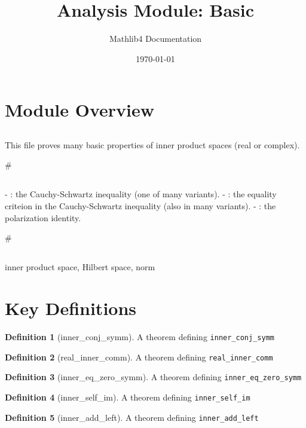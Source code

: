\documentclass{article}
\title{Analysis Module: Basic}
\author{Mathlib4 Documentation}
\date{\today}
\theoremstyle{definition}
\newtheorem{definition}{Definition}
\begin{document}
\maketitle

\section{Module Overview}
\subsection{\1}

This file proves many basic properties of inner product spaces (real or complex).

#\subsection{\1}

- \texttt{\1}: the Cauchy-Schwartz inequality (one of many variants).
- \texttt{\1}: the equality criteion in the Cauchy-Schwartz inequality (also in many
  variants).
- \texttt{\1}: the polarization identity.

#\subsection{\1}

inner product space, Hilbert space, norm

\section{Key Definitions}
\begin{definition}[inner_conj_symm]
A theorem defining \texttt{inner_conj_symm}
\end{definition}

\begin{definition}[real_inner_comm]
A theorem defining \texttt{real_inner_comm}
\end{definition}

\begin{definition}[inner_eq_zero_symm]
A theorem defining \texttt{inner_eq_zero_symm}
\end{definition}

\begin{definition}[inner_self_im]
A theorem defining \texttt{inner_self_im}
\end{definition}

\begin{definition}[inner_add_left]
A theorem defining \texttt{inner_add_left}
\end{definition}
\end{document}
